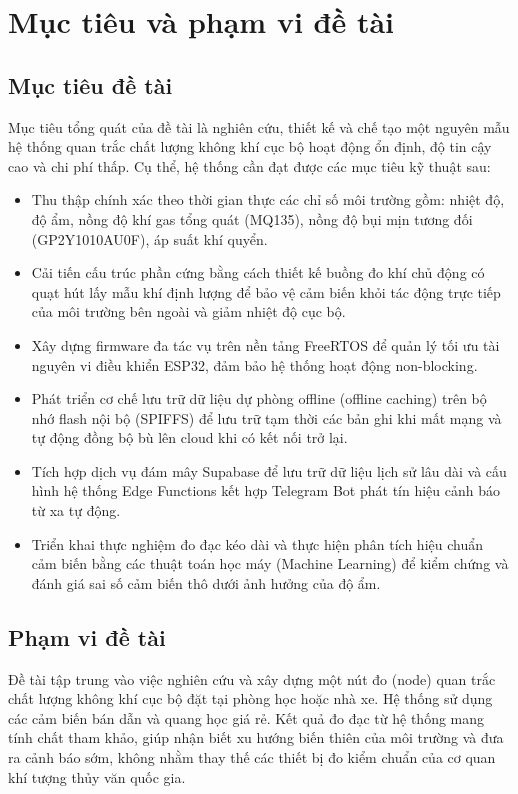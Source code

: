 \section{Mục tiêu và phạm vi đề tài}
\subsection{Mục tiêu đề tài}
Mục tiêu tổng quát của đề tài là nghiên cứu, thiết kế và chế tạo một nguyên mẫu hệ thống quan trắc chất lượng không khí cục bộ hoạt động ổn định, độ tin cậy cao và chi phí thấp. Cụ thể, hệ thống cần đạt được các mục tiêu kỹ thuật sau:
\begin{itemize}
    \item Thu thập chính xác theo thời gian thực các chỉ số môi trường gồm: nhiệt độ, độ ẩm, nồng độ khí gas tổng quát (MQ135), nồng độ bụi mịn tương đối (GP2Y1010AU0F), áp suất khí quyển.
    \item Cải tiến cấu trúc phần cứng bằng cách thiết kế buồng đo khí chủ động có quạt hút lấy mẫu khí định lượng để bảo vệ cảm biến khỏi tác động trực tiếp của môi trường bên ngoài và giảm nhiệt độ cục bộ.
    \item Xây dựng firmware đa tác vụ trên nền tảng FreeRTOS để quản lý tối ưu tài nguyên vi điều khiển ESP32, đảm bảo hệ thống hoạt động non-blocking.
    \item Phát triển cơ chế lưu trữ dữ liệu dự phòng offline (offline caching) trên bộ nhớ flash nội bộ (SPIFFS) để lưu trữ tạm thời các bản ghi khi mất mạng và tự động đồng bộ bù lên cloud khi có kết nối trở lại.
    \item Tích hợp dịch vụ đám mây Supabase để lưu trữ dữ liệu lịch sử lâu dài và cấu hình hệ thống Edge Functions kết hợp Telegram Bot phát tín hiệu cảnh báo từ xa tự động.
    \item Triển khai thực nghiệm đo đạc kéo dài và thực hiện phân tích hiệu chuẩn cảm biến bằng các thuật toán học máy (Machine Learning) để kiểm chứng và đánh giá sai số cảm biến thô dưới ảnh hưởng của độ ẩm.
\end{itemize}

\subsection{Phạm vi đề tài}
Đề tài tập trung vào việc nghiên cứu và xây dựng một nút đo (node) quan trắc chất lượng không khí cục bộ đặt tại phòng học hoặc nhà xe. Hệ thống sử dụng các cảm biến bán dẫn và quang học giá rẻ. Kết quả đo đạc từ hệ thống mang tính chất tham khảo, giúp nhận biết xu hướng biến thiên của môi trường và đưa ra cảnh báo sớm, không nhằm thay thế các thiết bị đo kiểm chuẩn của cơ quan khí tượng thủy văn quốc gia.

